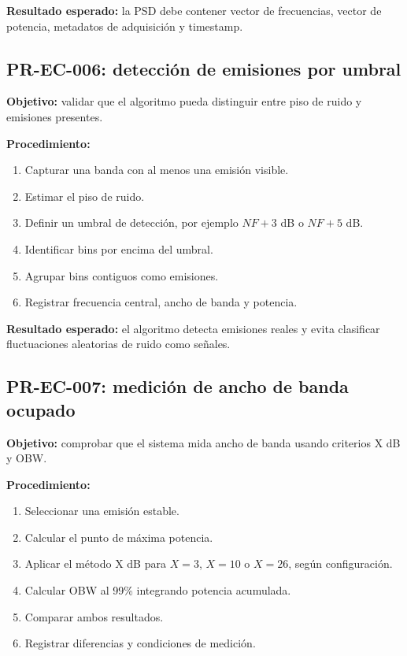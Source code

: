 \textbf{Resultado esperado:} la PSD debe contener vector de frecuencias, vector de potencia, metadatos de adquisición y timestamp.

\subsection{PR-EC-006: detección de emisiones por umbral}

\textbf{Objetivo:} validar que el algoritmo pueda distinguir entre piso de ruido y emisiones presentes.

\textbf{Procedimiento:}

\begin{enumerate}
    \item Capturar una banda con al menos una emisión visible.
    \item Estimar el piso de ruido.
    \item Definir un umbral de detección, por ejemplo $NF + 3$ dB o $NF + 5$ dB.
    \item Identificar bins por encima del umbral.
    \item Agrupar bins contiguos como emisiones.
    \item Registrar frecuencia central, ancho de banda y potencia.
\end{enumerate}

\textbf{Resultado esperado:} el algoritmo detecta emisiones reales y evita clasificar fluctuaciones aleatorias de ruido como señales.

\subsection{PR-EC-007: medición de ancho de banda ocupado}

\textbf{Objetivo:} comprobar que el sistema mida ancho de banda usando criterios X dB y OBW.

\textbf{Procedimiento:}

\begin{enumerate}
    \item Seleccionar una emisión estable.
    \item Calcular el punto de máxima potencia.
    \item Aplicar el método X dB para $X = 3$, $X = 10$ o $X = 26$, según configuración.
    \item Calcular OBW al 99\% integrando potencia acumulada.
    \item Comparar ambos resultados.
    \item Registrar diferencias y condiciones de medición.
\end{enumerate}

